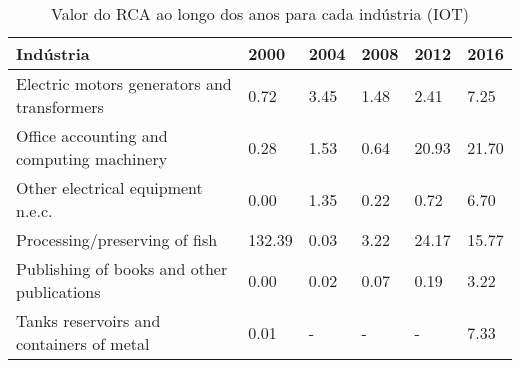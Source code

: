 \begin{table}
\centering
\caption{Valor do RCA ao longo dos anos para cada indústria (IOT)}
\begin{tabular}{p{6cm}p{1.5cm}p{1.5cm}p{1.5cm}p{1.5cm}p{1.5cm}}
\toprule
                                  Indústria &   2000 & 2004 & 2008 &  2012 &  2016 \\
\midrule
Electric motors generators and transformers &   0.72 & 3.45 & 1.48 &  2.41 &  7.25 \\
  Office accounting and computing machinery &   0.28 & 1.53 & 0.64 & 20.93 & 21.70 \\
          Other electrical equipment n.e.c. &   0.00 & 1.35 & 0.22 &  0.72 &  6.70 \\
              Processing/preserving of fish & 132.39 & 0.03 & 3.22 & 24.17 & 15.77 \\
 Publishing of books and other publications &   0.00 & 0.02 & 0.07 &  0.19 &  3.22 \\
   Tanks reservoirs and containers of metal &   0.01 &    - &    - &     - &  7.33 \\
\bottomrule
\end{tabular}
\end{table}
